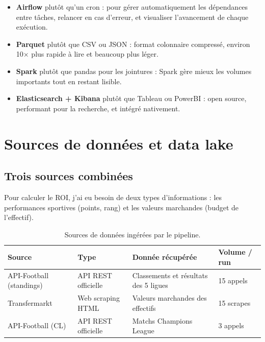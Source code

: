 \documentclass[11pt,a4paper]{article}
\begin{document}
\begin{itemize}
  \item \textbf{Airflow} plutôt qu'un cron : pour gérer automatiquement les
        dépendances entre tâches, relancer en cas d'erreur, et visualiser
        l'avancement de chaque exécution.
  \item \textbf{Parquet} plutôt que CSV ou JSON : format colonnaire compressé,
        environ 10× plus rapide à lire et beaucoup plus léger.
  \item \textbf{Spark} plutôt que pandas pour les jointures : Spark gère mieux
        les volumes importants tout en restant lisible.
  \item \textbf{Elasticsearch + Kibana} plutôt que Tableau ou PowerBI : open
        source, performant pour la recherche, et intégré nativement.
\end{itemize}

\section{Sources de données et data lake}

\subsection*{Trois sources combinées}

Pour calculer le ROI, j'ai eu besoin de deux types d'informations : les
performances sportives (points, rang) et les valeurs marchandes (budget de
l'effectif).

\begin{table}[h]
\centering
\small
\begin{tabularx}{\textwidth}{@{}llXl@{}}
\toprule
\textbf{Source} & \textbf{Type} & \textbf{Donnée récupérée} & \textbf{Volume / run} \\
\midrule
API-Football (standings) & API REST officielle & Classements et résultats des 5 ligues & 15 appels \\
Transfermarkt            & Web scraping HTML   & Valeurs marchandes des effectifs       & 15 scrapes \\
API-Football (CL)        & API REST officielle & Matchs Champions League                & 3 appels \\
\bottomrule
\end{tabularx}
\caption{Sources de données ingérées par le pipeline.}
\end{table}
\end{document}
